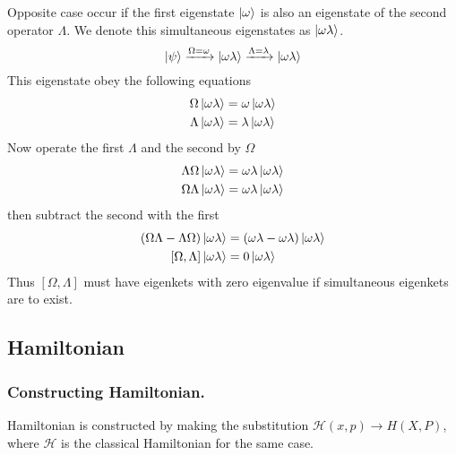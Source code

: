 \documentclass[../../../main.tex]{subfiles}
\begin{document}
Opposite case occur if the first eigenstate $\ket{\omega }$ is also an eigenstate of the second operator $\Lambda$.
We denote this simultaneous eigenstates as $\ket{\omega\lambda}$.
\begin{equation*}
    \ket{\psi}\xrightarrow{\Omega=\omega}\ket{\omega\lambda}\xrightarrow{\Lambda=\lambda}\ket{\omega\lambda}
\end{equation*}
This eigenstate obey the following equations
\begin{align*}
    \Omega \ket{\omega\lambda}&= \omega \ket{\omega\lambda}\\
    \Lambda\ket{\omega\lambda}&= \lambda \ket{\omega\lambda}
\end{align*}
Now operate the first $\Lambda$ and the second by $\Omega$
\begin{align*}
    \Lambda\Omega \ket{\omega\lambda}&= \omega\lambda \ket{\omega\lambda}\\
    \Omega\Lambda\ket{\omega\lambda}&= \omega\lambda \ket{\omega\lambda}
\end{align*}
then subtract the second with the first
\begin{align*}
    (\Omega\Lambda-\Lambda\Omega)\ket{\omega\lambda}&= (\omega\lambda-\omega\lambda)\ket{\omega\lambda}\\
    [\Omega,\Lambda]\ket{\omega\lambda}&= 0 \ket{\omega\lambda}
\end{align*}
Thus $[\Omega,\Lambda]$ must have eigenkets with zero eigenvalue if simultaneous eigenkets are to exist.

\subsection{Hamiltonian}
\subsubsection{Constructing Hamiltonian.}
Hamiltonian is constructed by making the substitution $\mathcal{H}(x,p) \rightarrow H(X,P)$, where $\mathcal{H }$ is the classical Hamiltonian for the same case.
\end{document}
